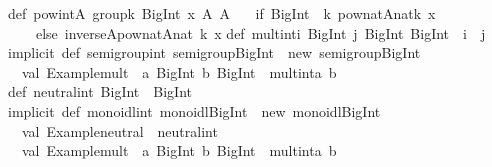\begin{isabellebody}
\begin{isamarkuptext}
{\isacharbraceright}\isanewline
\isanewline
def\ pow{\isacharunderscore}int{\isacharbrackleft}A{\isacharcolon}\ group{\isacharbrackright}{\isacharparenleft}k{\isacharcolon}\ BigInt{\isacharcomma}\ x{\isacharcolon}\ A{\isacharparenright}{\isacharcolon}\ A\ {\isacharequal}\isanewline
\ \ {\isacharparenleft}if\ {\isacharparenleft}BigInt{\isacharparenleft}{}{\isacharparenright}\ {\isacharless}{\isacharequal}\ k{\isacharparenright}\ pow{\isacharunderscore}nat{\isacharbrackleft}A{\isacharbrackright}{\isacharparenleft}nat{\isacharparenleft}k{\isacharparenright}{\isacharcomma}\ x{\isacharparenright}\isanewline
\ \ \ \ else\ inverse{\isacharbrackleft}A{\isacharbrackright}{\isacharparenleft}pow{\isacharunderscore}nat{\isacharbrackleft}A{\isacharbrackright}{\isacharparenleft}nat{\isacharparenleft}{\isacharparenleft}{\isacharminus}\ k{\isacharparenright}{\isacharparenright}{\isacharcomma}\ x{\isacharparenright}{\isacharparenright}{\isacharparenright}\isanewline
\isanewline
def\ mult{\isacharunderscore}int{\isacharparenleft}i{\isacharcolon}\ BigInt{\isacharcomma}\ j{\isacharcolon}\ BigInt{\isacharparenright}{\isacharcolon}\ BigInt\ {\isacharequal}\ i\ {\isacharplus}\ j\isanewline
\isanewline
implicit\ def\ semigroup{\isacharunderscore}int{\isacharcolon}\ semigroup{\isacharbrackleft}BigInt{\isacharbrackright}\ {\isacharequal}\ new\ semigroup{\isacharbrackleft}BigInt{\isacharbrackright}\ {\isacharbraceleft}\isanewline
\ \ val\ {\isacharbackquote}Example{\isachardot}mult{\isacharbackquote}\ {\isacharequal}\ {\isacharparenleft}a{\isacharcolon}\ BigInt{\isacharcomma}\ b{\isacharcolon}\ BigInt{\isacharparenright}\ {\isacharequal}{\isachargreater}\ mult{\isacharunderscore}int{\isacharparenleft}a{\isacharcomma}\ b{\isacharparenright}\isanewline
{\isacharbraceright}\isanewline
\isanewline
def\ neutral{\isacharunderscore}int{\isacharcolon}\ BigInt\ {\isacharequal}\ BigInt{\isacharparenleft}{}{\isacharparenright}\isanewline
\isanewline
implicit\ def\ monoidl{\isacharunderscore}int{\isacharcolon}\ monoidl{\isacharbrackleft}BigInt{\isacharbrackright}\ {\isacharequal}\ new\ monoidl{\isacharbrackleft}BigInt{\isacharbrackright}\ {\isacharbraceleft}\isanewline
\ \ val\ {\isacharbackquote}Example{\isachardot}neutral{\isacharbackquote}\ {\isacharequal}\ neutral{\isacharunderscore}int\isanewline
\ \ val\ {\isacharbackquote}Example{\isachardot}mult{\isacharbackquote}\ {\isacharequal}\ {\isacharparenleft}a{\isacharcolon}\ BigInt{\isacharcomma}\ b{\isacharcolon}\ BigInt{\isacharparenright}\ {\isacharequal}{\isachargreater}\ mult{\isacharunderscore}int{\isacharparenleft}a{\isacharcomma}\ b{\isacharparenright}\isanewline

\end{isamarkuptext}
\end{isabellebody}
